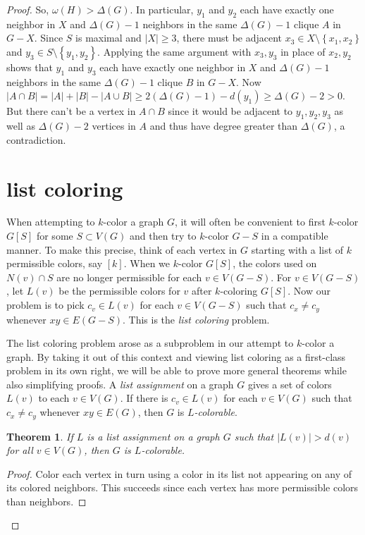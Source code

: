 \documentclass{amsbook}
\theoremstyle{plain}
\newtheorem{theorem}{Theorem}
\numberwithin{equation}{chapter}
\newcommand{\set}[1]{\left\{ #1 \right\}}
\newcommand{\card}[1]{\left|#1\right|}
\newcommand{\irange}[1]{\left[#1\right]}
\begin{document}
\begin{proof}
So, $\omega(H) > \Delta(G)$.  In particular, $y_1$ and $y_2$ each have exactly one neighbor in $X$ and $\Delta(G) - 1$ neighbors in the same $\Delta(G) -1$ clique $A$ in $G - X$.
 Since $S$ is maximal and $\card{X} \ge 3$, there must be adjacent
$x_3 \in X \setminus \set{x_1,x_2}$ and $y_3 \in S \setminus \set{y_1,y_2}$.  Applying the same argument with $x_3, y_3$ in place of $x_2, y_2$ shows
that $y_1$ and $y_3$ each have exactly one neighbor in $X$ and $\Delta(G) - 1$ neighbors in the same $\Delta(G) -1$ clique $B$ in $G - X$.
Now $\card{A\cap B} = \card{A} + \card{B} - \card{A\cup B} \ge 2(\Delta(G) - 1) - d(y_1) \ge \Delta(G) - 2 > 0$.  But there can't be a vertex
in $A \cap B$ since it would be adjacent to $y_1,y_2,y_3$ as well as $\Delta(G) - 2$ vertices in $A$ and thus have degree greater than $\Delta(G)$, a contradiction. 


\section*{list coloring}
When attempting to $k$-color a graph $G$, it will often be convenient to first $k$-color $G[S]$ for some $S \subset V(G)$ and then try to 
$k$-color $G-S$ in a compatible manner. To make this precise, think of each vertex in $G$ starting with a list of $k$ permissible colors, say $\irange{k}$.
When we $k$-color $G[S]$, the colors used on $N(v) \cap S$ are no longer permissible for each $v \in V(G-S)$.  For $v \in V(G-S)$, let $L(v)$ be the permissible colors
for $v$ after $k$-coloring $G[S]$.  Now our problem is to pick $c_v \in L(v)$ for each $v \in V(G-S)$ such that $c_x \ne c_y$ whenever $xy \in E(G-S)$.  This is the
\emph{list coloring} problem.

The list coloring problem arose as a subproblem in our attempt to $k$-color a graph.  By taking it out of this context and viewing list coloring as a first-class problem in its own
right, we will be able to prove more general theorems while also simplifying proofs.  A \emph{list assignment} on a graph $G$ gives a set of colors $L(v)$ to each $v \in V(G)$.  
If there is $c_v \in L(v)$ for each $v \in V(G)$ such that $c_x \ne c_y$ whenever $xy \in E(G)$, then $G$ is \emph{$L$-colorable}.

\begin{theorem}\label{FirstListBound}
If $L$ is a list assignment on a graph $G$ such that $\card{L(v)} > d(v)$ for all $v \in V(G)$, then $G$ is $L$-colorable.
\end{theorem}
\begin{proof}
Color each vertex in turn using a color in its list not appearing on any of its colored neighbors.  
This succeeds since each vertex has more permissible colors than neighbors.
\end{proof}


\end{proof}
\end{document}
